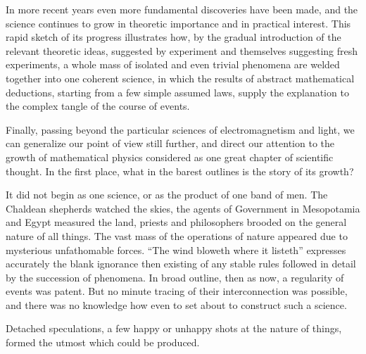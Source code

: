 \documentclass[12pt,leqno]{book}[2005/09/16]
\newcommand{\PageSep}[1]{\ignorespaces}
\begin{document}
In more recent years even more fundamental
discoveries have been made, and the
science continues to grow in theoretic importance
and in practical interest. This rapid
sketch of its progress illustrates how, by the
gradual introduction of the relevant theoretic
ideas, suggested by experiment and themselves
suggesting fresh experiments, a whole
mass of isolated and even trivial phenomena
are welded together into one coherent science,
in which the results of abstract mathematical
deductions, starting from a few simple assumed
\PageSep{36}
laws, supply the explanation to the
complex tangle of the course of events.

Finally, passing beyond the particular
sciences of electromagnetism and light, we
can generalize our point of view still further,
and direct our attention to the growth of
mathematical physics considered as one great
chapter of scientific thought. In the first
place, what in the barest outlines is the story
of its growth?

It did not begin as one science, or as the
product of one band of men. The Chaldean
shepherds watched the skies, the agents of
Government in Mesopotamia and Egypt
measured the land, priests and philosophers
brooded on the general nature of all things.
The vast mass of the operations of nature
appeared due to mysterious unfathomable
forces. ``The wind bloweth where it listeth''
expresses accurately the blank ignorance then
existing of any stable rules followed in detail
by the succession of phenomena. In broad outline,
then as now, a regularity of events was
patent. But no minute tracing of their interconnection
was possible, and there was no
knowledge how even to set about to construct
such a science.

Detached speculations, a few happy or unhappy
shots at the nature of things, formed
the utmost which could be produced.
\end{document}
